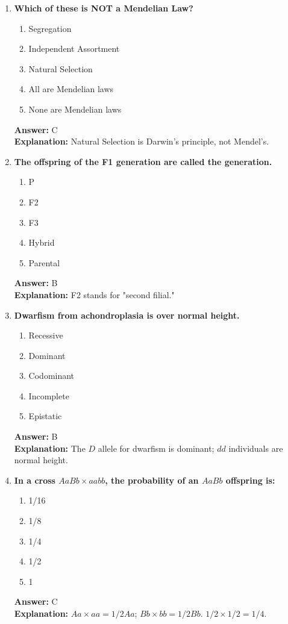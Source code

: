 \documentclass[11pt, a4paper]{article}
\begin{document}
\begin{enumerate}[leftmargin=*, label=\arabic*.]
\item \textbf{Which of these is NOT a Mendelian Law?}
\begin{enumerate}[label=\Alph*.]
\item Segregation
\item Independent Assortment
\item Natural Selection
\item All are Mendelian laws
\item None are Mendelian laws
\end{enumerate}
\textbf{Answer:} C \\
\textbf{Explanation:} Natural Selection is Darwin’s principle, not Mendel’s.

\item \textbf{The offspring of the F1 generation are called the \underline{\hspace{1cm}} generation.}
\begin{enumerate}[label=\Alph*.]
\item P
\item F2
\item F3
\item Hybrid
\item Parental
\end{enumerate}
\textbf{Answer:} B \\
\textbf{Explanation:} F2 stands for "second filial."

\item \textbf{Dwarfism from achondroplasia is \underline{\hspace{1cm}} over normal height.}
\begin{enumerate}[label=\Alph*.]
\item Recessive
\item Dominant
\item Codominant
\item Incomplete
\item Epistatic
\end{enumerate}
\textbf{Answer:} B \\
\textbf{Explanation:} The $D$ allele for dwarfism is dominant; $dd$ individuals are normal height.

\item \textbf{In a cross $AaBb \times aabb$, the probability of an $AaBb$ offspring is:}
\begin{enumerate}[label=\Alph*.]
\item 1/16
\item 1/8
\item 1/4
\item 1/2
\item 1
\end{enumerate}
\textbf{Answer:} C \\
\textbf{Explanation:} $Aa \times aa = 1/2 Aa$; $Bb \times bb = 1/2 Bb$. $1/2 \times 1/2 = 1/4$.


\end{enumerate}
\end{document}
